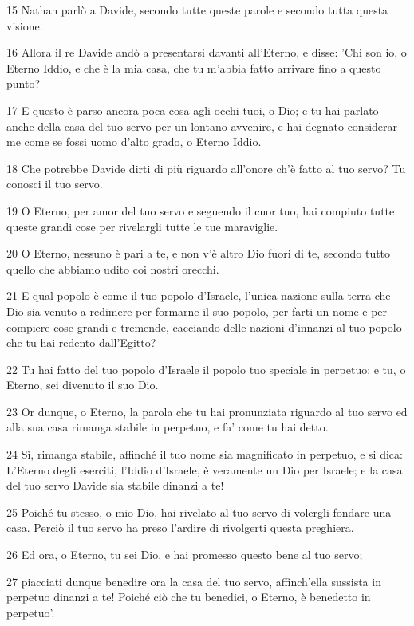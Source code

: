 \par 15 Nathan parlò a Davide, secondo tutte queste parole e secondo tutta questa visione.
\par 16 Allora il re Davide andò a presentarsi davanti all'Eterno, e disse: 'Chi son io, o Eterno Iddio, e che è la mia casa, che tu m'abbia fatto arrivare fino a questo punto?
\par 17 E questo è parso ancora poca cosa agli occhi tuoi, o Dio; e tu hai parlato anche della casa del tuo servo per un lontano avvenire, e hai degnato considerar me come se fossi uomo d'alto grado, o Eterno Iddio.
\par 18 Che potrebbe Davide dirti di più riguardo all'onore ch'è fatto al tuo servo? Tu conosci il tuo servo.
\par 19 O Eterno, per amor del tuo servo e seguendo il cuor tuo, hai compiuto tutte queste grandi cose per rivelargli tutte le tue maraviglie.
\par 20 O Eterno, nessuno è pari a te, e non v'è altro Dio fuori di te, secondo tutto quello che abbiamo udito coi nostri orecchi.
\par 21 E qual popolo è come il tuo popolo d'Israele, l'unica nazione sulla terra che Dio sia venuto a redimere per formarne il suo popolo, per farti un nome e per compiere cose grandi e tremende, cacciando delle nazioni d'innanzi al tuo popolo che tu hai redento dall'Egitto?
\par 22 Tu hai fatto del tuo popolo d'Israele il popolo tuo speciale in perpetuo; e tu, o Eterno, sei divenuto il suo Dio.
\par 23 Or dunque, o Eterno, la parola che tu hai pronunziata riguardo al tuo servo ed alla sua casa rimanga stabile in perpetuo, e fa' come tu hai detto.
\par 24 Sì, rimanga stabile, affinché il tuo nome sia magnificato in perpetuo, e si dica: L'Eterno degli eserciti, l'Iddio d'Israele, è veramente un Dio per Israele; e la casa del tuo servo Davide sia stabile dinanzi a te!
\par 25 Poiché tu stesso, o mio Dio, hai rivelato al tuo servo di volergli fondare una casa. Perciò il tuo servo ha preso l'ardire di rivolgerti questa preghiera.
\par 26 Ed ora, o Eterno, tu sei Dio, e hai promesso questo bene al tuo servo;
\par 27 piacciati dunque benedire ora la casa del tuo servo, affinch'ella sussista in perpetuo dinanzi a te! Poiché ciò che tu benedici, o Eterno, è benedetto in perpetuo'.

